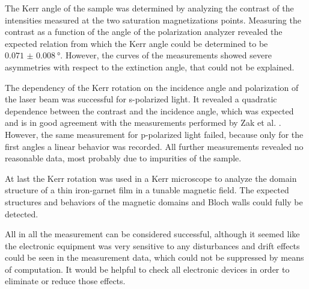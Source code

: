 \documentclass[a4paper]{scrartcl}
\numberwithin{equation}{section}
\numberwithin{figure}{section}
\numberwithin{table}{section}
\begin{document}
The Kerr angle of the sample was determined by analyzing the contrast of the intensities measured at the two saturation magnetizations points. Measuring the contrast as a function of the angle of the polarization analyzer revealed the expected relation from which the Kerr angle could be determined to be $\SI{0.071(8)}{\degree}$. However, the curves of the measurements showed severe asymmetries with respect to the extinction angle, that could not be explained.

The dependency of the Kerr rotation on the incidence angle and polarization of the laser beam was successful for s-polarized light. It revealed a quadratic dependence between the contrast and the incidence angle, which was expected and is in good agreement with the measurements performed by  Zak et al. \cite{paper}. However, the same measurement for p-polarized light failed, because only for the first angles a linear behavior was recorded. All further measurements revealed no reasonable data, most probably due to impurities of the sample.

At last the Kerr rotation was used in a Kerr microscope to analyze the domain structure of a thin iron-garnet film in a tunable magnetic field. The expected structures and behaviors of the magnetic domains and Bloch walls could fully be detected.

All in all the measurement can be considered successful, although it seemed like the electronic equipment was very sensitive to any disturbances and drift effects could be seen in the measurement data, which could not be suppressed by means of computation. It would be helpful to check all electronic devices in order to eliminate or reduce those effects. 
 

\end{document}
